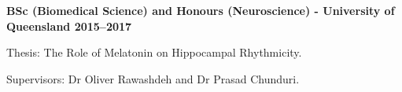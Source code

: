 \textbf{BSc (Biomedical Science) and Honours (Neuroscience) - University of Queensland \hfill 2015--2017} \par
Thesis: The Role of Melatonin on Hippocampal Rhythmicity.\par
Supervisors: Dr Oliver Rawashdeh and Dr Prasad Chunduri.\par
